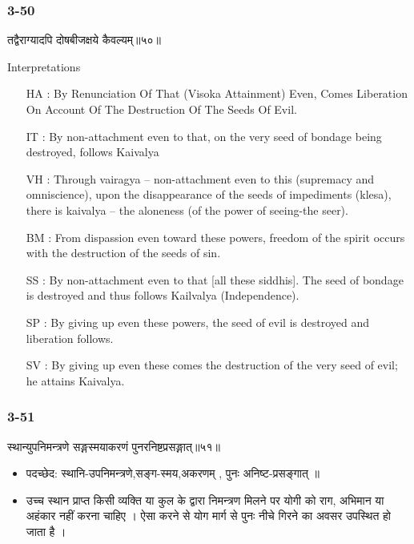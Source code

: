 \begin{frame}[fragile]\frametitle{3-50}
\begin{sanskrit}
तद्वैराग्यादपि दोषबीजक्षये कैवल्यम्॥५०॥
\end{sanskrit}

Interpretations
\begin{itemize}	
\item [HA]: By Renunciation Of That (Visoka Attainment) Even, Comes Liberation On Account Of The Destruction Of The Seeds Of Evil.
\item [IT]: By non-attachment even to that, on the very seed of bondage being destroyed, follows Kaivalya
\item [VH]: Through vairagya – non-attachment even to this (supremacy and omniscience), upon the disappearance of the seeds of impediments (klesa), there is kaivalya – the aloneness (of the power of seeing-the seer).
\item [BM]: From dispassion even toward these powers, freedom of the spirit occurs with the destruction of the seeds of sin.
\item [SS]: By non-attachment even to that [all these siddhis]. The seed of bondage is destroyed and thus follows Kailvalya (Independence).
\item [SP]: By giving up even these powers, the seed of evil is destroyed and liberation follows.
\item [SV]: By giving up even these comes the destruction of the very seed of evil; he attains Kaivalya. 
\end{itemize}
\end{frame}


\begin{frame}[fragile]\frametitle{3-51}
\begin{sanskrit}
स्थान्युपनिमन्त्रणे सङ्गस्मयाकरणं पुनरनिष्टप्रसङ्गात्॥५१॥
\end{sanskrit}

\begin{itemize}
\item पदच्छेद:  स्थानि-उपनिमन्त्रणे,सङ्ग-स्मय,अकरणम् , पुनः अनिष्ट-प्रसङ्गात् ॥
\item  उच्च स्थान प्राप्त किसी व्यक्ति या कुल के द्वारा निमन्त्रण मिलने पर योगी को राग, अभिमान या अहंकार नहीं करना चाहिए । ऐसा करने से योग मार्ग से पुनः नीचे गिरने का अवसर उपस्थित हो जाता है ।
\end{itemize}
\end{frame}

